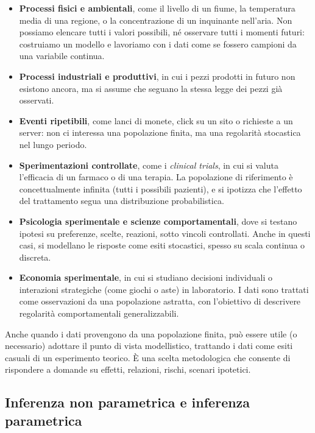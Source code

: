 \documentclass[
  11pt,
]{book}
\providecommand{\tightlist}{%
  \setlength{\itemsep}{0pt}\setlength{\parskip}{0pt}}
\theoremstyle{mytheoremstyle}
\theoremstyle{mydefstyle}
\begin{document}
\begin{itemize}
\tightlist
\item
  \textbf{Processi fisici e ambientali}, come il livello di un fiume, la temperatura media di una regione, o la concentrazione di un inquinante nell'aria. Non possiamo elencare tutti i valori possibili, né osservare tutti i momenti futuri: costruiamo un modello e lavoriamo con i dati come se fossero campioni da una variabile continua.
\item
  \textbf{Processi industriali e produttivi}, in cui i pezzi prodotti in futuro non esistono ancora, ma si assume che seguano la stessa legge dei pezzi già osservati.
\item
  \textbf{Eventi ripetibili}, come lanci di monete, click su un sito o richieste a un server: non ci interessa una popolazione finita, ma una regolarità stocastica nel lungo periodo.
\item
  \textbf{Sperimentazioni controllate}, come i \emph{clinical trials}, in cui si valuta l'efficacia di un farmaco o di una terapia. La popolazione di riferimento è concettualmente infinita (tutti i possibili pazienti), e si ipotizza che l'effetto del trattamento segua una distribuzione probabilistica.
\item
  \textbf{Psicologia sperimentale e scienze comportamentali}, dove si testano ipotesi su preferenze, scelte, reazioni, sotto vincoli controllati. Anche in questi casi, si modellano le risposte come esiti stocastici, spesso su scala continua o discreta.
\item
  \textbf{Economia sperimentale}, in cui si studiano decisioni individuali o interazioni strategiche (come giochi o aste) in laboratorio. I dati sono trattati come osservazioni da una popolazione astratta, con l'obiettivo di descrivere regolarità comportamentali generalizzabili.
\end{itemize}

Anche quando i dati provengono da una popolazione finita, può essere utile (o necessario) adottare il punto di vista modellistico, trattando i dati come esiti casuali di un esperimento teorico. È una scelta metodologica che consente di rispondere a domande su effetti, relazioni, rischi, scenari ipotetici.

\subsection{Inferenza non parametrica e inferenza parametrica}\label{inferenza-non-parametrica-e-inferenza-parametrica}
\end{document}
